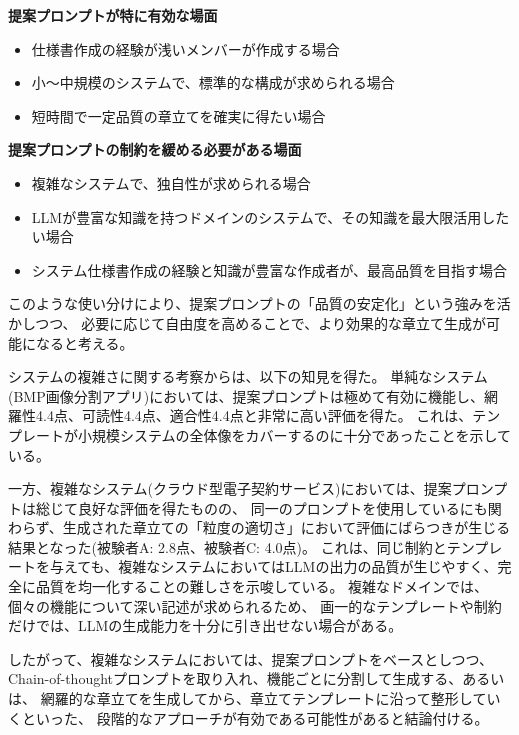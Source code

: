 \textbf{提案プロンプトが特に有効な場面}
\begin{itemize}
    \item 仕様書作成の経験が浅いメンバーが作成する場合
    \item 小〜中規模のシステムで、標準的な構成が求められる場合
    \item 短時間で一定品質の章立てを確実に得たい場合
\end{itemize}

\textbf{提案プロンプトの制約を緩める必要がある場面}
\begin{itemize}
    \item 複雑なシステムで、独自性が求められる場合
    \item LLMが豊富な知識を持つドメインのシステムで、その知識を最大限活用したい場合
    \item システム仕様書作成の経験と知識が豊富な作成者が、最高品質を目指す場合
\end{itemize}

このような使い分けにより、提案プロンプトの「品質の安定化」という強みを活かしつつ、
必要に応じて自由度を高めることで、より効果的な章立て生成が可能になると考える。

システムの複雑さに関する考察からは、以下の知見を得た。
単純なシステム(BMP画像分割アプリ)においては、提案プロンプトは極めて有効に機能し、網羅性4.4点、可読性4.4点、適合性4.4点と非常に高い評価を得た。
これは、テンプレートが小規模システムの全体像をカバーするのに十分であったことを示している。

一方、複雑なシステム(クラウド型電子契約サービス)においては、提案プロンプトは総じて良好な評価を得たものの、
同一のプロンプトを使用しているにも関わらず、生成された章立ての「粒度の適切さ」において評価にばらつきが生じる結果となった(被験者A: 2.8点、被験者C: 4.0点)。
これは、同じ制約とテンプレートを与えても、複雑なシステムにおいてはLLMの出力の品質が生じやすく、完全に品質を均一化することの難しさを示唆している。
複雑なドメインでは、個々の機能について深い記述が求められるため、
画一的なテンプレートや制約だけでは、LLMの生成能力を十分に引き出せない場合がある。

したがって、複雑なシステムにおいては、提案プロンプトをベースとしつつ、
Chain-of-thoughtプロンプト\cite{chainofthought}を取り入れ、機能ごとに分割して生成する、あるいは、
網羅的な章立てを生成してから、章立てテンプレートに沿って整形していくといった、
段階的なアプローチが有効である可能性があると結論付ける。
